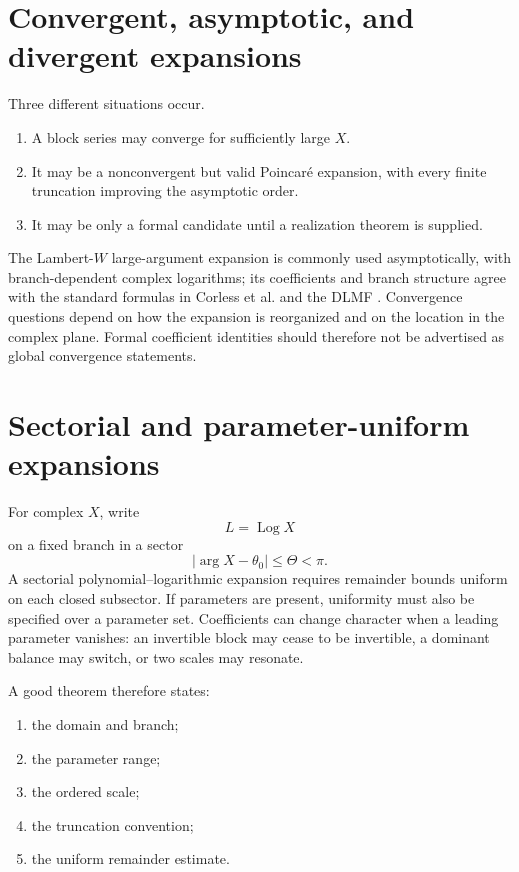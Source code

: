 \documentclass[11pt,oneside]{book}
\theoremstyle{definition}
\theoremstyle{remark}
\DeclareMathOperator{\Log}{Log}
\begin{document}
\section{Convergent, asymptotic, and divergent expansions}
Three different situations occur.
\begin{enumerate}
\item A block series may converge for sufficiently large $X$.
\item It may be a nonconvergent but valid Poincar\'e expansion, with every
      finite truncation improving the asymptotic order.
\item It may be only a formal candidate until a realization theorem is
      supplied.
\end{enumerate}

The Lambert-$W$ large-argument expansion is commonly used asymptotically,
with branch-dependent complex logarithms; its coefficients and branch
structure agree with the standard formulas in Corless et al. and the DLMF
\cite{Corless1996,DLMF413}. Convergence questions depend on how the
expansion is reorganized and on the location in the complex plane. Formal
coefficient identities should therefore not be advertised as global
convergence statements.

\section{Sectorial and parameter-uniform expansions}
For complex $X$, write
\[
 L=\Log X
\]
on a fixed branch in a sector
\[
 |\arg X-\theta_0|\le\Theta<\pi.
\]
A sectorial polynomial--logarithmic expansion requires remainder bounds
uniform on each closed subsector. If parameters are present, uniformity
must also be specified over a parameter set. Coefficients can change
character when a leading parameter vanishes: an invertible block may cease
to be invertible, a dominant balance may switch, or two scales may resonate.

A good theorem therefore states:
\begin{enumerate}
\item the domain and branch;
\item the parameter range;
\item the ordered scale;
\item the truncation convention;
\item the uniform remainder estimate.
\end{enumerate}
\end{document}
